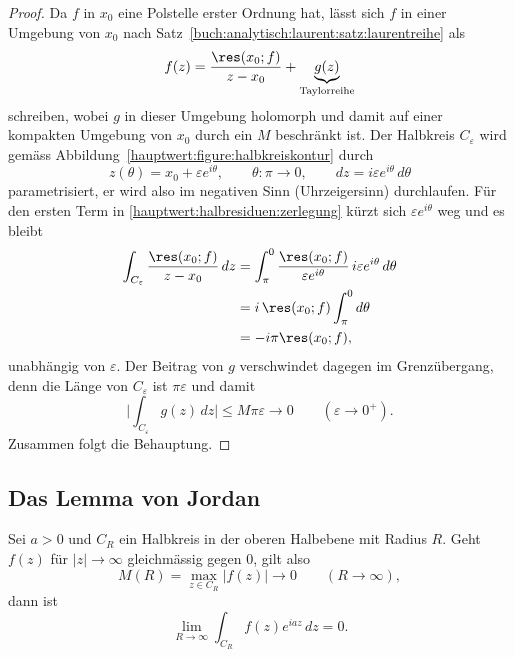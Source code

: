 \begin{proof}
Da $f$ in $x_0$ eine Polstelle erster Ordnung hat, lässt sich $f$ in einer
Umgebung von $x_0$ nach Satz~\ref{buch:analytisch:laurent:satz:laurentreihe}
als
\begin{equation}
  f(z) = \frac{\res(x_0;f)}{z - x_0}
       + \underbrace{g(z)}_{\text{Taylorreihe}}
  \label{hauptwert:halbresiduen:zerlegung}
\end{equation}
schreiben, wobei $g$ in dieser Umgebung holomorph und damit auf einer
kompakten Umgebung von $x_0$ durch ein $M$ beschränkt ist.
Der Halbkreis $C_\varepsilon$ wird gemäss
Abbildung~\ref{hauptwert:figure:halbkreiskontur} durch
\begin{equation}
  z(\theta) = x_0 + \varepsilon e^{i\theta},
  \qquad \theta\colon \pi \to 0,
  \qquad dz = i\varepsilon e^{i\theta}\,d\theta
\end{equation}
  parametrisiert, er wird also im negativen Sinn (Uhrzeigersinn) durchlaufen.
Für den ersten Term in \eqref{hauptwert:halbresiduen:zerlegung} kürzt sich
$\varepsilon e^{i\theta}$ weg und es bleibt
\begin{equation}
\begin{aligned}
  \int_{C_\varepsilon} \frac{\res(x_0;f)}{z - x_0}\,dz
  &= \int_{\pi}^{0} \frac{\res(x_0;f)}{\varepsilon e^{i\theta}}
     \, i\varepsilon e^{i\theta}\,d\theta \\
  &= i\,\res(x_0;f) \int_{\pi}^{0} d\theta \\
  &= -i\pi \res(x_0;f),
\end{aligned}
\end{equation}
unabhängig von $\varepsilon$.
Der Beitrag von $g$ verschwindet dagegen im Grenzübergang, denn die Länge
von $C_\varepsilon$ ist $\pi\varepsilon$ und damit
\begin{equation}
  \biggl| \int_{C_\varepsilon} g(z)\,dz \biggr|
  \le M \pi \varepsilon
  \to 0
  \qquad (\varepsilon \to 0^+).
\end{equation}
Zusammen folgt die Behauptung.
\end{proof}


\subsection{Das Lemma von Jordan
\label{hauptwert:subsection:jordan}}


\begin{lemma}
\label{hauptwert:lemma:jordan}
Sei $a > 0$ und $C_R$ ein Halbkreis in der oberen Halbebene mit Radius $R$.
Geht $f(z)$ für $|z| \to \infty$ gleichmässig gegen $0$, gilt also
\begin{equation}
  M(R) = \max_{z \in C_R} |f(z)| \to 0
  \qquad (R \to \infty),
  \label{hauptwert:equation:jordanbedingung}
\end{equation}
dann ist
\begin{equation}
  \lim_{R \to \infty} \int_{C_R} f(z) e^{i a z}\,dz = 0.
\end{equation}
\end{lemma}

